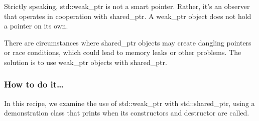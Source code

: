 
Strictly speaking, std::weak\_ptr is not a smart pointer. Rather, it's an observer that operates in cooperation with shared\_ptr. A weak\_ptr object does not hold a pointer on its own.

There are circumstances where shared\_ptr objects may create dangling pointers or race conditions, which could lead to memory leaks or other problems. The solution is to use weak\_ptr objects with shared\_ptr.

\subsubsection{How to do it…}

In this recipe, we examine the use of std::weak\_ptr with std::shared\_ptr, using a demonstration class that prints when its constructors and destructor are called.

